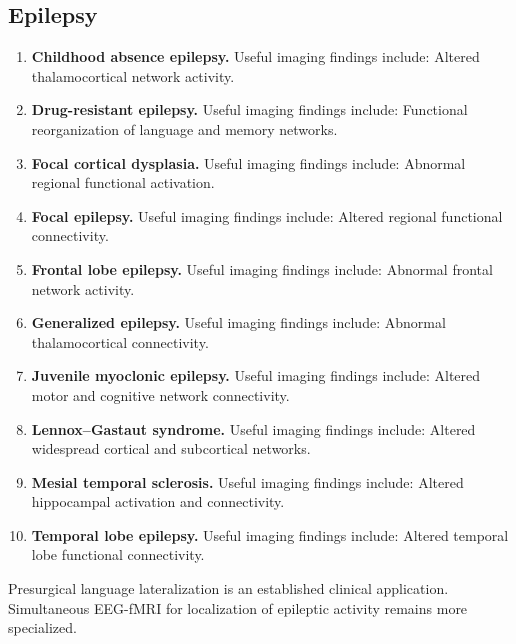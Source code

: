\subsection{Epilepsy}
\begin{enumerate}[leftmargin=*,itemsep=0.45em,topsep=0.4em]
\item \textbf{Childhood absence epilepsy.} Useful imaging findings include: Altered thalamocortical network activity.
\item \textbf{Drug-resistant epilepsy.} Useful imaging findings include: Functional reorganization of language and memory networks.
\item \textbf{Focal cortical dysplasia.} Useful imaging findings include: Abnormal regional functional activation.
\item \textbf{Focal epilepsy.} Useful imaging findings include: Altered regional functional connectivity.
\item \textbf{Frontal lobe epilepsy.} Useful imaging findings include: Abnormal frontal network activity.
\item \textbf{Generalized epilepsy.} Useful imaging findings include: Abnormal thalamocortical connectivity.
\item \textbf{Juvenile myoclonic epilepsy.} Useful imaging findings include: Altered motor and cognitive network connectivity.
\item \textbf{Lennox--Gastaut syndrome.} Useful imaging findings include: Altered widespread cortical and subcortical networks.
\item \textbf{Mesial temporal sclerosis.} Useful imaging findings include: Altered hippocampal activation and connectivity.
\item \textbf{Temporal lobe epilepsy.} Useful imaging findings include: Altered temporal lobe functional connectivity.
\end{enumerate}
Presurgical language lateralization is an established clinical application. Simultaneous EEG-fMRI for localization of epileptic activity remains more specialized.

